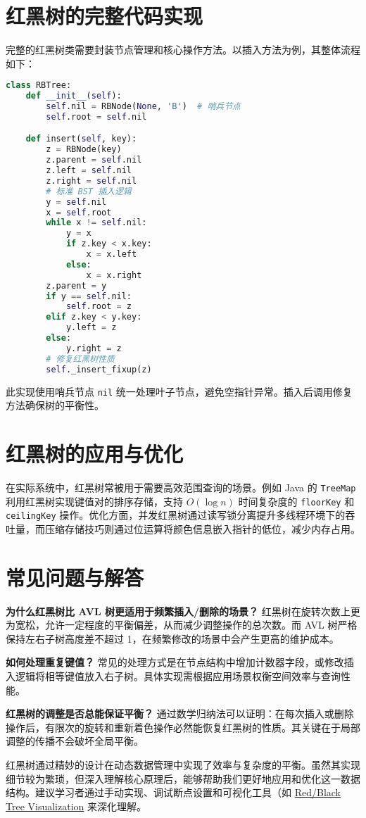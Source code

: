 \chapter{红黑树的完整代码实现}
完整的红黑树类需要封装节点管理和核心操作方法。以插入方法为例，其整体流程如下：\par
\begin{lstlisting}[language=python]
class RBTree:
    def __init__(self):
        self.nil = RBNode(None, 'B')  # 哨兵节点
        self.root = self.nil

    def insert(self, key):
        z = RBNode(key)
        z.parent = self.nil
        z.left = self.nil
        z.right = self.nil
        # 标准 BST 插入逻辑
        y = self.nil
        x = self.root
        while x != self.nil:
            y = x
            if z.key < x.key:
                x = x.left
            else:
                x = x.right
        z.parent = y
        if y == self.nil:
            self.root = z
        elif z.key < y.key:
            y.left = z
        else:
            y.right = z
        # 修复红黑树性质
        self._insert_fixup(z)
\end{lstlisting}
此实现使用哨兵节点 \verb!nil! 统一处理叶子节点，避免空指针异常。插入后调用修复方法确保树的平衡性。\par
\chapter{红黑树的应用与优化}
在实际系统中，红黑树常被用于需要高效范围查询的场景。例如 Java 的 \verb!TreeMap! 利用红黑树实现键值对的排序存储，支持 $O(\log n)$ 时间复杂度的 \verb!floorKey! 和 \verb!ceilingKey! 操作。优化方面，并发红黑树通过读写锁分离提升多线程环境下的吞吐量，而压缩存储技巧则通过位运算将颜色信息嵌入指针的低位，减少内存占用。\par
\chapter{常见问题与解答}
\textbf{为什么红黑树比 AVL 树更适用于频繁插入/删除的场景？} 红黑树在旋转次数上更为宽松，允许一定程度的平衡偏差，从而减少调整操作的总次数。而 AVL 树严格保持左右子树高度差不超过 1，在频繁修改的场景中会产生更高的维护成本。\par
\textbf{如何处理重复键值？} 常见的处理方式是在节点结构中增加计数器字段，或修改插入逻辑将相等键值放入右子树。具体实现需根据应用场景权衡空间效率与查询性能。\par
\textbf{红黑树的调整是否总能保证平衡？} 通过数学归纳法可以证明：在每次插入或删除操作后，有限次的旋转和重新着色操作必然能恢复红黑树的性质。其关键在于局部调整的传播不会破坏全局平衡。\par
红黑树通过精妙的设计在动态数据管理中实现了效率与复杂度的平衡。虽然其实现细节较为繁琐，但深入理解核心原理后，能够帮助我们更好地应用和优化这一数据结构。建议学习者通过手动实现、调试断点设置和可视化工具（如 \href{https://www.cs.usfca.edu/~galles/visualization/RedBlack.html}{Red/Black Tree Visualization} 来深化理解。\par

